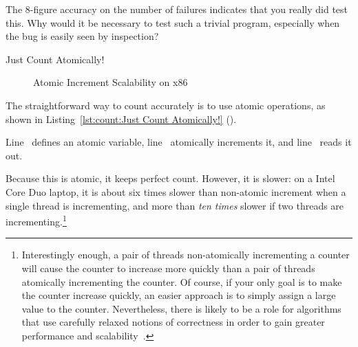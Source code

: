 \QuickQuiz{}
	The 8-figure accuracy on the number of failures indicates
	that you really did test this.
	Why would it be necessary to test such a trivial program,
	especially when the bug is easily seen by inspection?
 \QuickQuizEnd

\begin{listing}[tbp]

\caption{Just Count Atomically!}
\label{lst:count:Just Count Atomically!}
\end{listing}

\begin{figure}[tb]
\centering
{}
\caption{Atomic Increment Scalability on x86}
\label{fig:count:Atomic Increment Scalability on x86}
\end{figure}

The straightforward way to count accurately is to use atomic operations,
as shown in
Listing~\ref{lst:count:Just Count Atomically!} ().
\begin{lineref}
Line~ defines an atomic variable,
line~ atomically increments it, and
line~ reads it out.
\end{lineref}
Because this is atomic, it keeps perfect count.
However, it is slower: on a Intel Core Duo laptop, it is about
six times slower than non-atomic increment
when a single thread is incrementing, and more than \emph{ten times}
slower if two threads are incrementing.\footnote{
	Interestingly enough, a pair of threads non-atomically incrementing
	a counter will cause the counter to increase more quickly than
	a pair of threads atomically incrementing the counter.
	Of course, if your only goal is to make the counter increase
	quickly, an easier approach is to simply assign a large value
	to the counter.
	Nevertheless, there is likely to be a role for algorithms that
	use carefully relaxed notions of correctness in order to gain
	greater performance and
	scalability~\cite{Andrews91textbook,Arcangeli03,DavidUngar2011unsync}.}

